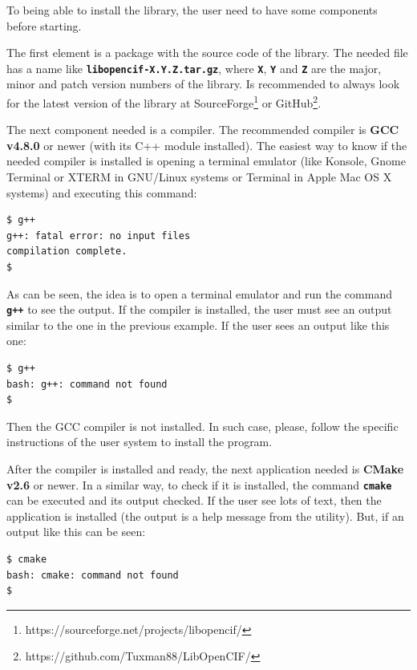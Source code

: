 \documentclass[11pt,twoside,openany,x11names,svgnames]{memoir}
\begin{document}
To being able to install the library, the user need to have some components before starting.

The first element is a package with the source code of the library. The needed file has a name like \textbf{\texttt{libopencif-X.Y.Z.tar.gz}}, where \textbf{\texttt{X}}, \textbf{\texttt{Y}} and \textbf{\texttt{Z}} are the major, minor and patch version numbers of the library. Is recommended to always look for the latest version of the library at SourceForge\footnote{https://sourceforge.net/projects/libopencif/} or GitHub\footnote{https://github.com/Tuxman88/LibOpenCIF/}.

The next component needed is a compiler. The recommended compiler is \textbf{GCC v4.8.0} or newer (with its C++ module installed). The easiest way to know if the needed compiler is installed is opening a terminal emulator (like Konsole, Gnome Terminal or XTERM in GNU/Linux systems or Terminal in Apple Mac OS X systems) and executing this command:

\begin{lstlisting}[frame=single,style=SystemCommandStyle]
$ g++
g++: fatal error: no input files
compilation complete.
$
\end{lstlisting}

As can be seen, the idea is to open a terminal emulator and run the command \textbf{\texttt{g++}} to see the output. If the compiler is installed, the user must see an output similar to the one in the previous example. If the user sees an output like this one:

\begin{lstlisting}[frame=single,style=SystemCommandStyle]
$ g++
bash: g++: command not found
$
\end{lstlisting}

Then the GCC compiler is not installed. In such case, please, follow the specific instructions of the user system to install the program.

After the compiler is installed and ready, the next application needed is \textbf{CMake v2.6} or newer. In a similar way, to check if it is installed, the command \textbf{\texttt{cmake}} can be executed and its output checked. If the user see lots of text, then the application is installed (the output is a help message from the utility). But, if an output like this can be seen:

\begin{lstlisting}[frame=single,style=SystemCommandStyle]
$ cmake
bash: cmake: command not found
$
\end{lstlisting}
\end{document}

